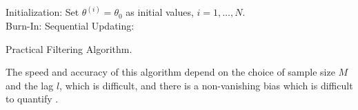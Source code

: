 \begin{algorithm}[h]
\SetAlgoLined 
Initialization: Set $\theta^{(i)}=\theta_0$ as initial values, $i=1,\ldots,N$.  \\
Burn-In: 
Sequential Updating: 
 \caption{Practical Filtering Algorithm.}\label{algorithmPraticalFilter}
\end{algorithm}

The speed and accuracy of this algorithm depend on the choice of sample size $M$ and the lag $l$, which is difficult, and there is a non-vanishing bias which is difficult to quantify \cite{polson2008practical} \cite{kantas2009overview}.




